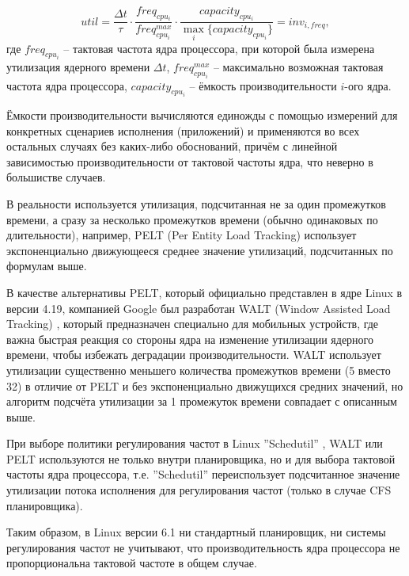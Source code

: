     \begin{equation}
        util = \frac{\Delta t}{\tau} \cdot \frac{freq_{cpu_{i}}}{freq^{max}_{cpu_{i}}} \cdot
               \frac{capacity_{cpu_{i}}}{\max_i \{capacity_{cpu_{i}}\}} =
            inv_{i, freq},
    \end{equation}
    где $freq_{cpu_{i}}$ -- тактовая частота ядра процессора, при которой была измерена утилизация
    ядерного времени $\Delta t$, $freq^{max}_{cpu_{i}}$ -- максимально возможная тактовая частота ядра
    процессора, $capacity_{cpu_{i}}$ -- ёмкость производительности $i$-ого ядра.

    Ёмкости производительности вычисляются единожды с помощью измерений для конкретных сценариев
    исполнения (приложений) и применяются во всех остальных случаях без каких-либо обоснований,
    причём с линейной зависимостью производительности от тактовой частоты ядра, что неверно
    в большистве случаев.

    В реальности используется утилизация, подсчитанная не за один промежутков времени, а сразу за
    несколько промежутков времени (обычно одинаковых по длительности), например, PELT
    (Per Entity Load Tracking) \cite{KernelDocsSchedutil} использует экспоненциально движующееся
    среднее значение утилизаций, подсчитанных по формулам выше.

    В качестве альтернативы PELT, который официально представлен в ядре Linux в версии 4.19,
    компанией Google был разработан WALT (Window Assisted Load Tracking) \cite{QualcommWALT},
    который предназначен специально для мобильных устройств, где важна быстрая реакция со стороны ядра
    на изменение утилизации ядерного времени, чтобы избежать деградации производительности.
    WALT использует утилизации существенно меньшего количества промежутков времени (5 вместо 32) в
    отличие от PELT и без экспоненциально движущихся средних значений, но алгоритм подсчёта утилизации
    за 1 промежуток времени совпадает с описанным выше.

    При выборе политики регулирования частот в Linux ''Schedutil'' \cite{KernelDocsSchedutil},
    WALT или PELT используются не только внутри планировщика, но и для выбора тактовой частоты ядра
    процессора, т.е. ''Schedutil'' переиспользует подсчитанное значение утилизации потока исполнения
    для регулирования частот (только в случае CFS планировщика).

    Таким образом, в Linux версии 6.1 ни стандартный планировщик, ни системы регулирования частот
    не учитывают, что производительность ядра процессора не пропорциональна тактовой частоте
    в общем случае.

